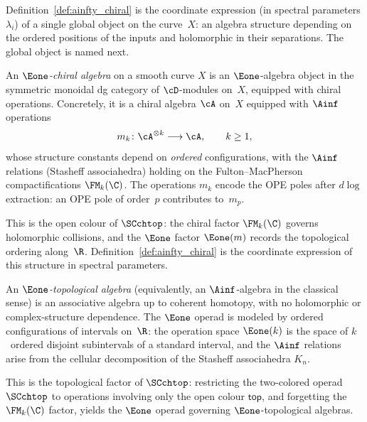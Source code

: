 Definition~\ref{def:ainfty_chiral} is the coordinate expression (in spectral parameters $\lambda_i$) of a single global object on the curve~$X$: an algebra structure depending on the ordered positions of the inputs and holomorphic in their separations. The global object is named next.

\begin{definition}
\label{def:e1-chiral-algebra}
An \emph{$\Eone$-chiral algebra} on a smooth curve $X$ is an
$\Eone$-algebra object in the symmetric monoidal dg category of
$\cD$-modules on~$X$, equipped with chiral operations. Concretely, it is a chiral algebra $\cA$ on~$X$
equipped with $\Ainf$ operations
\[
m_k \colon \cA^{\otimes k} \longrightarrow \cA,
\qquad k \ge 1,
\]
whose structure constants depend on \emph{ordered} configurations,
with the $\Ainf$ relations (Stasheff associahedra) holding on the
Fulton--MacPherson compactifications $\FM_k(\C)$. The operations
$m_k$ encode the OPE poles after $d\!\log$ extraction: an OPE pole
of order~$p$ contributes to~$m_p$.

This is the open colour of $\SCchtop$: the chiral factor
$\FM_k(\C)$ governs holomorphic collisions, and the $\Eone$ factor
$\Eone(m)$ records the topological ordering along~$\R$.
Definition~\ref{def:ainfty_chiral} is the coordinate expression of
this structure in spectral parameters.
\end{definition}

\begin{definition}
\label{def:e1-topological-algebra}
An \emph{$\Eone$-topological algebra} (equivalently, an
$\Ainf$-algebra in the classical sense) is an associative algebra up
to coherent homotopy, with no holomorphic or complex-structure
dependence. The $\Eone$ operad is modeled by ordered configurations
of intervals on~$\R$: the operation space $\Eone(k)$ is the space of
$k$~ordered disjoint subintervals of a standard interval, and the
$\Ainf$ relations arise from the cellular decomposition of the
Stasheff associahedra $K_n$.

This is the topological factor of $\SCchtop$: restricting the
two-colored operad $\SCchtop$ to operations involving only the open
colour $\mathsf{top}$, and forgetting the $\FM_k(\C)$ factor, yields
the $\Eone$ operad governing $\Eone$-topological algebras.
\end{definition}

